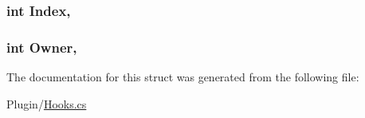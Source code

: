 \subsubsection[{Index}]{\setlength{\rightskip}{0pt plus 5cm}int Index\hspace{0.3cm}{\ttfamily [get]}, {\ttfamily [set]}}\label{structOTA_1_1Plugin_1_1HookArgs_1_1KillProjectileReceived_a075e1e3c9dd399cef584d7338cc37938}
\hypertarget{structOTA_1_1Plugin_1_1HookArgs_1_1KillProjectileReceived_a1b5549aee7b8f03889fac15e1cf22552}{}
\subsubsection[{Owner}]{\setlength{\rightskip}{0pt plus 5cm}int Owner\hspace{0.3cm}{\ttfamily [get]}, {\ttfamily [set]}}\label{structOTA_1_1Plugin_1_1HookArgs_1_1KillProjectileReceived_a1b5549aee7b8f03889fac15e1cf22552}


The documentation for this struct was generated from the following file\+:\begin{DoxyCompactItemize}
\item 
Plugin/\hyperlink{Hooks_8cs}{Hooks.\+cs}\end{DoxyCompactItemize}
